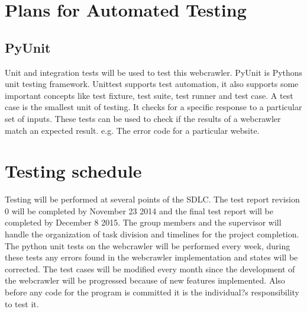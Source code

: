 \documentclass[12pt]{article}
\begin{document}
\section{Plans for Automated Testing}
\subsection{PyUnit}
Unit and integration tests will be used to test this webcrawler. PyUnit is Python\textsc{}s unit testing framework. Unittest supports test automation, it also supports some important concepts like test fixture, test suite, test runner and test case. A test case is the smallest unit of testing. It checks for a specific response to a particular set of inputs.  These tests can be used to check if the results of a webcrawler match an expected result. e.g. The error code for a particular website.

\section{Testing schedule}
Testing will be performed at several points of the SDLC.  The test report revision 0 will be completed by November 23 2014 and the final test report will be completed by December 8 2015. The group members and the supervisor will handle the organization of task division and timelines for the project completion. The python unit tests on the webcrawler will be performed every week, during these tests any errors found in the webcrawler implementation and states will be corrected. The test cases will be modified every month since the development of the webcrawler will be progressed because of new features implemented. Also before any code for the program is committed it is the individual?s responsibility to test it.
\end{document}
